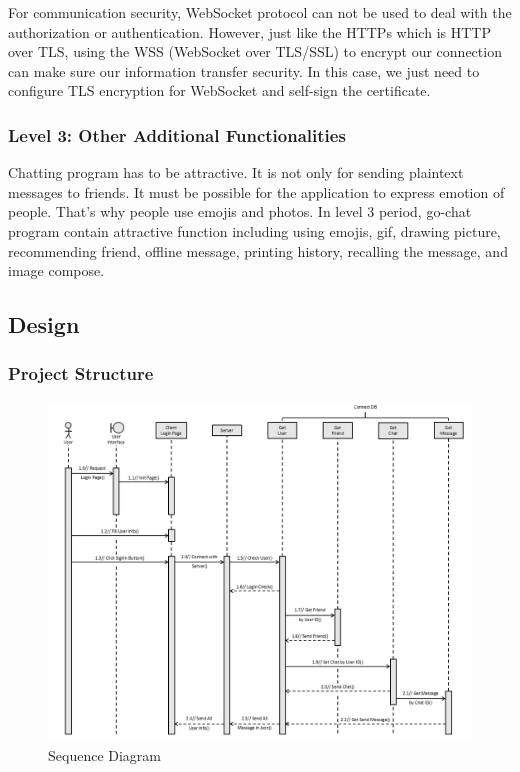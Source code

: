 \documentclass[a4paper,11pt]{article}
\begin{document}
For communication security, WebSocket protocol can not be used to deal with the authorization or authentication. However, just like the HTTPs which is HTTP over TLS, using the WSS (WebSocket over TLS/SSL) to encrypt our connection can make sure our information transfer security. In this case, we just need to configure TLS encryption for WebSocket and self-sign the certificate.

\subsubsection{Level 3: Other Additional Functionalities}

Chatting program has to be attractive. It is not only for sending plaintext messages to friends. It must be possible for the application to express emotion of people. That's why people use emojis and photos. In level 3 period, go-chat program contain attractive function including using emojis, gif, drawing picture, recommending friend, offline message, printing history, recalling the message, and image compose.

\subsection{Design}

\subsubsection{Project Structure}

\begin{figure}[h!]
\centering
\includegraphics[width = 1 \textwidth ]{SequenceDiagram.jpg}
\caption{\label{fig:UML}Sequence Diagram}
\end{figure}
\end{document}
